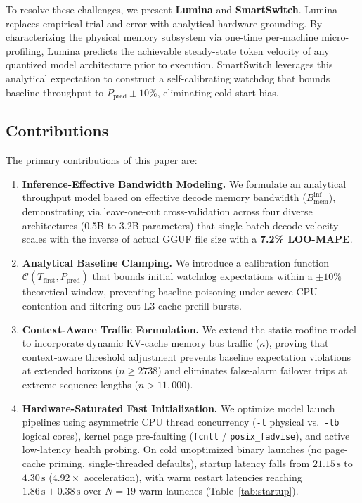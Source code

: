 \documentclass[11pt,a4paper]{article}
\newcommand{\Binf}{B_{\mathrm{mem}}^{\mathrm{inf}}}
\newcommand{\Tfirst}{T_{\mathrm{first}}}
\newcommand{\Ppred}{P_{\mathrm{pred}}}
\newcommand{\Cfun}{\mathcal{C}}
\newcommand{\su}{\,\mathrm{s}}
\newcommand{\code}[1]{\texttt{#1}}
\begin{document}
To resolve these challenges, we present \textbf{Lumina} and \textbf{SmartSwitch}. Lumina replaces empirical trial-and-error with analytical hardware grounding. By characterizing the physical memory subsystem via one-time per-machine micro-profiling, Lumina predicts the achievable steady-state token velocity of any quantized model architecture prior to execution. SmartSwitch leverages this analytical expectation to construct a self-calibrating watchdog that bounds baseline throughput to $\Ppred \pm 10\%$, eliminating cold-start bias.

\subsection*{Contributions}
The primary contributions of this paper are:
\begin{enumerate}[leftmargin=*]
\item \textbf{Inference-Effective Bandwidth Modeling.} We formulate an analytical throughput model based on effective decode memory bandwidth ($\Binf$), demonstrating via leave-one-out cross-validation across four diverse architectures (0.5B to 3.2B parameters) that single-batch decode velocity scales with the inverse of actual GGUF file size with a \textbf{7.2\% LOO-MAPE}.
\item \textbf{Analytical Baseline Clamping.} We introduce a calibration function $\Cfun(\Tfirst, \Ppred)$ that bounds initial watchdog expectations within a $\pm 10\%$ theoretical window, preventing baseline poisoning under severe CPU contention and filtering out L3 cache prefill bursts.
\item \textbf{Context-Aware Traffic Formulation.} We extend the static roofline model to incorporate dynamic KV-cache memory bus traffic ($\kappa$), proving that context-aware threshold adjustment prevents baseline expectation violations at extended horizons ($n \ge 2738$) and eliminates false-alarm failover trips at extreme sequence lengths ($n > 11{,}000$).
\item \textbf{Hardware-Saturated Fast Initialization.} We optimize model launch pipelines using asymmetric CPU thread concurrency (\code{-t} physical vs.\ \code{-tb} logical cores), kernel page pre-faulting (\code{fcntl} / \code{posix\_fadvise}), and active low-latency health probing. On cold unoptimized binary launches (no page-cache priming, single-threaded defaults), startup latency falls from $21.15\su$ to $4.30\su$ ($4.92\times$ acceleration), with warm restart latencies reaching $1.86\su \pm 0.38\su$ over $N=19$ warm launches (Table~\ref{tab:startup}).

\end{enumerate}
\end{document}
